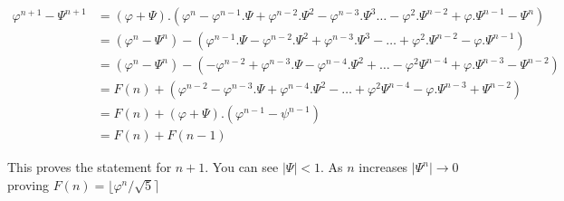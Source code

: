 \documentclass{article}
\begin{document}
\begin{equation}
\begin{split}
  \varphi^{n+1} - \Psi^{n+1} & = (\varphi + \Psi) . (\varphi^n - \varphi^{n-1}.\Psi + \varphi^{n-2}.\Psi^2 - \varphi^{n-3}.\Psi^3 \dots - \varphi^2.\Psi^{n-2} + \varphi.\Psi^{n-1} - \Psi^n) \\
  & = (\varphi^n - \Psi^n) - (\varphi^{n-1}.\Psi - \varphi^{n-2}.\Psi^2 + \varphi^{n-3}.\Psi^3 - \dots + \varphi^2.\Psi^{n-2} - \varphi.\Psi^{n-1} ) \\
  & = (\varphi^n - \Psi^n) - (-\varphi^{n-2} + \varphi^{n-3}.\Psi - \varphi^{n-4}.\Psi^2 + \dots - \varphi^2\Psi^{n-4} + \varphi.\Psi^{n-3} - \Psi^{n-2} ) \\
  & = F(n) + (\varphi^{n-2} - \varphi^{n-3}.\Psi + \varphi^{n-4}.\Psi^2 - \dots + \varphi^2\Psi^{n-4} - \varphi.\Psi^{n-3} + \Psi^{n-2} ) \\
  & = F(n) + (\varphi + \Psi).(\varphi^{n-1} - \psi^{n-1}) \\
  & = F(n) + F(n-1)
\end{split}
\end{equation}

This proves the statement for $n+1$. You can see $\lvert\Psi\rvert < 1$. As $n$ increases $\lvert\Psi^n\rvert \to 0 $ proving $F(n) = \lfloor\varphi^n/\sqrt 5\rceil$
\end{document}
